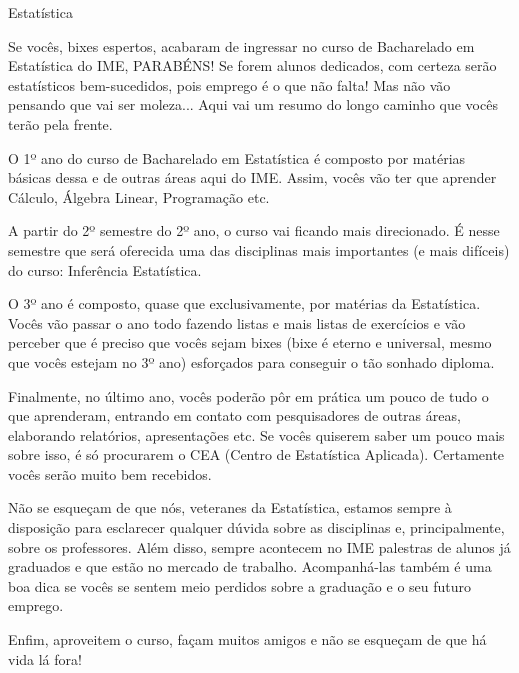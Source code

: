 \begin{subsecao}{Estatística}

Se vocês, bixes espertos, acabaram de ingressar no curso de Bacharelado em
Estatística do IME, PARABÉNS! Se forem alunos dedicados, com certeza serão
estatísticos bem-sucedidos, pois emprego é o que não falta! Mas não vão
pensando que vai ser moleza... Aqui vai um resumo do longo caminho que vocês
terão pela frente.

O 1º ano do curso de Bacharelado em Estatística é composto por matérias básicas
dessa e de outras áreas aqui do IME. Assim, vocês vão ter que aprender Cálculo,
Álgebra Linear, Programação etc.

A partir do 2º semestre do 2º ano, o curso vai ficando mais direcionado. É nesse
semestre que será oferecida uma das disciplinas mais importantes (e mais
difíceis) do curso: Inferência Estatística.

O 3º ano é composto, quase que exclusivamente, por matérias da
Estatística. Vocês vão passar o ano todo fazendo listas e mais listas de
exercícios e vão perceber que é preciso que vocês sejam bixes (bixe é eterno e
universal, mesmo que vocês estejam no 3º ano) esforçados para conseguir o tão
sonhado diploma.

Finalmente, no último ano, vocês poderão pôr em prática um pouco de tudo o que
aprenderam, entrando em contato com pesquisadores de outras áreas, elaborando
relatórios, apresentações etc. Se vocês quiserem saber um pouco mais sobre
isso, é só procurarem o CEA (Centro de Estatística Aplicada). Certamente vocês
serão muito bem recebidos.

Não se esqueçam de que nós, veteranes da Estatística, estamos sempre à
disposição para esclarecer qualquer dúvida sobre as disciplinas e,
principalmente, sobre os professores. Além disso, sempre acontecem no IME
palestras de alunos já graduados e que estão no mercado de trabalho. Acompanhá-las
também é uma boa dica se vocês se sentem meio perdidos sobre a graduação e
o seu futuro emprego.

Enfim, aproveitem o curso, façam muitos amigos e não se esqueçam de que há vida lá
fora!

\end{subsecao}
